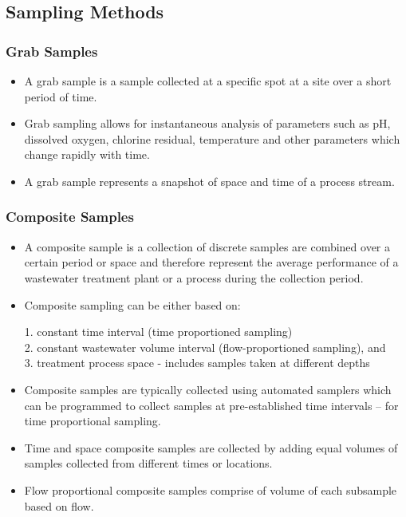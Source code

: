 \documentclass{article}
\begin{document}
\subsection{Sampling Methods}
\subsubsection{Grab Samples}
				\begin{itemize}
					\item A grab sample is a sample collected at a specific spot at a site over a short period of time.  
					\item Grab sampling allows for instantaneous analysis of parameters such as pH, dissolved oxygen, chlorine residual, temperature and other parameters which change rapidly with time.
					\item A grab sample represents a snapshot of space and time of a process stream.
					\end{itemize}
\subsubsection{Composite Samples}
				\begin{itemize}
					\item A composite sample is a collection of discrete samples are combined over a certain period or space and therefore represent the average performance of a wastewater treatment plant or a process during the collection period.\\  
					\item Composite sampling can be either based on:
					      
					      1. constant time interval (time proportioned sampling)\\
					      2. constant wastewater volume interval (flow-proportioned sampling), and\\
					      3. treatment process space - includes samples taken at different depths\\
					      
					\item Composite samples are typically collected using automated samplers which can be programmed to collect samples at pre-established time intervals – for time proportional sampling.
					\item Time and space composite samples are collected by adding equal volumes of samples collected from different times or locations.  
					\item Flow proportional composite samples comprise of volume of each subsample based on flow.\\  
				\end{itemize}
				
\end{document}
